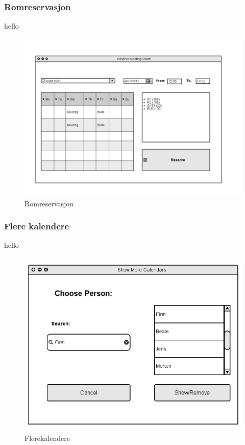 \subsubsection{Romreservasjon}
hello

\begin{figure}[H]
\centering
\includegraphics[scale=0.65]{images/romreservasjon.png}
\caption{Romreservasjon}
\label{romreservasjon_image}
\end{figure}

\subsubsection{Flere kalendere}
hello

\begin{figure}[H]
\centering
\includegraphics[scale=0.5]{images/flerekalendere.png}
\caption{Flerekalendere}
\label{flerekalendere_image}
\end{figure}

